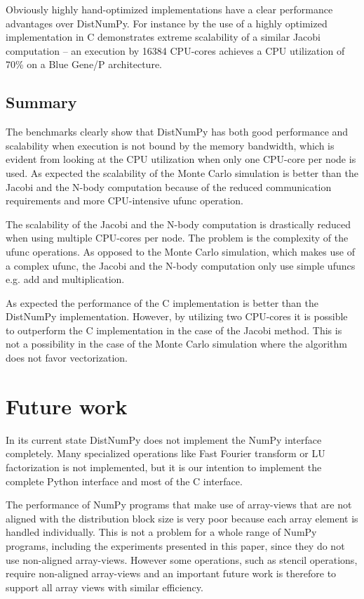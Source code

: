 \documentclass{sigplanconf}
\begin{document}
Obviously highly hand-optimized implementations have a clear performance advantages over DistNumPy. For instance by the use of a highly optimized implementation in C \cite{Kristensen09} demonstrates extreme scalability of a similar Jacobi computation -- an execution by 16384 CPU-cores achieves a CPU utilization of 70\% on a Blue Gene/P architecture. 

\subsection{Summary}
The benchmarks clearly show that DistNumPy has both good performance and scalability when execution is not bound by the memory bandwidth, which is evident from looking at the CPU utilization when only one CPU-core per node is used. As expected the scalability of the Monte Carlo simulation is better than the Jacobi and the N-body computation because of the reduced communication requirements and more CPU-intensive ufunc operation. 

The scalability of the Jacobi and the N-body computation is drastically reduced when using multiple CPU-cores per node. The problem is the complexity of the ufunc operations. As opposed to the Monte Carlo simulation, which makes use of a complex ufunc, the Jacobi and the N-body computation only use simple ufuncs e.g. add and multiplication.

As expected the performance of the C implementation is better than the DistNumPy implementation. However, by utilizing two CPU-cores it is possible to outperform the C implementation in the case of the Jacobi method. This is not a possibility in the case of the Monte Carlo simulation where the algorithm does not favor vectorization.

\section{Future work}
In its current state DistNumPy does not implement the NumPy interface completely. Many specialized operations like Fast Fourier transform or LU factorization is not implemented, but it is our intention to implement the complete Python interface and most of the C interface.

The performance of NumPy programs that make use of array-views that are not aligned with the distribution block size is very poor because each array element is handled individually. This is not a problem for a whole range of NumPy programs, including the experiments presented in this paper, since they do not use non-aligned array-views. However some operations, such as stencil operations, require non-aligned array-views and an important future work is therefore to support all array views with similar efficiency.
\end{document}

